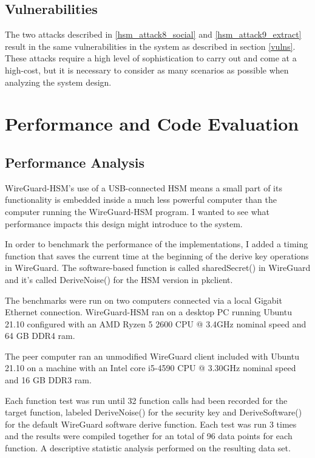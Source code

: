 \documentclass [11pt, proquest] {uwthesis}[2020/02/24]
\begin{document}
\section{Vulnerabilities}
\label{hsm-vulns}
The two attacks described in \ref{hsm_attack8_social} and \ref{hsm_attack9_extract} result in the same vulnerabilities in the system as described in section \ref{vulns}. These attacks require a high level of sophistication to carry out and come at a high-cost, but it is necessary to consider as many scenarios as possible when analyzing the system design.

\chapter{Performance and Code Evaluation}
\section{Performance Analysis}

\label{performance}
WireGuard-HSM's use of a USB-connected HSM means a small part of its functionality is embedded inside a much less powerful computer than the computer running the WireGuard-HSM program. I wanted to see what performance impacts this design might introduce to the system. 

In order to benchmark the performance of the implementations, I added a timing function that saves the current time at the beginning of the derive key operations in WireGuard. The software-based function is called sharedSecret() in WireGuard and it's called DeriveNoise() for the HSM version in pkclient.

The benchmarks were run on two computers connected via a local Gigabit Ethernet connection. 
WireGuard-HSM ran on a desktop PC running Ubuntu 21.10 configured with an AMD Ryzen 5 2600 CPU @ 3.4GHz nominal speed and 64 GB DDR4 ram. 

The peer computer ran an unmodified WireGuard client included with Ubuntu 21.10 on a machine with an Intel core i5-4590 CPU @ 3.30GHz nominal speed and 16 GB DDR3 ram.  

Each function test was run until 32 function calls had been recorded for the target function, labeled DeriveNoise() for the security key and DeriveSoftware() for the default WireGuard software derive function.
Each test was run 3 times and the results were compiled together for an total of 96 data points for each function. A descriptive statistic analysis performed on the resulting data set.
\end{document}
